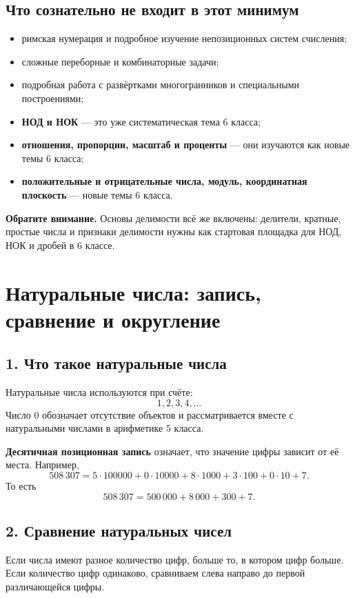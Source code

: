 \documentclass[12pt,a4paper]{article}
\newcommand{\term}[1]{\textbf{\textcolor{graphite}{#1}}}
\newcommand{\attention}[1]{%
  \par\smallskip
  {\color{accent}\textbf{Обратите внимание.}} #1\par\smallskip
}
\begin{document}
\subsection*{Что сознательно не входит в этот минимум}
\begin{itemize}
  \item римская нумерация и подробное изучение непозиционных систем счисления;
  \item сложные переборные и комбинаторные задачи;
  \item подробная работа с развёртками многогранников и специальными построениями;
  \item \textbf{НОД и НОК} --- это уже систематическая тема 6 класса;
  \item \textbf{отношения, пропорции, масштаб и проценты} --- они изучаются как новые темы 6 класса;
  \item \textbf{положительные и отрицательные числа, модуль, координатная плоскость} --- новые темы 6 класса.
\end{itemize}

\attention{Основы делимости всё же включены: делители, кратные, простые числа и признаки делимости нужны как стартовая площадка для НОД, НОК и дробей в 6 классе.}

\newpage

\section{Натуральные числа: запись, сравнение и округление}

\subsection*{1. Что такое натуральные числа}
Натуральные числа используются при счёте:
\[
1,2,3,4,\ldots
\]
Число $0$ обозначает отсутствие объектов и рассматривается вместе с натуральными числами в арифметике 5 класса.

\term{Десятичная позиционная запись} означает, что значение цифры зависит от её места. Например,
\[
508\,307=5\cdot100000+0\cdot10000+8\cdot1000+3\cdot100+0\cdot10+7.
\]
То есть
\[
508\,307=500\,000+8\,000+300+7.
\]

\subsection*{2. Сравнение натуральных чисел}
Если числа имеют разное количество цифр, больше то, в котором цифр больше. Если количество цифр одинаково, сравниваем слева направо до первой различающейся цифры.
\end{document}
